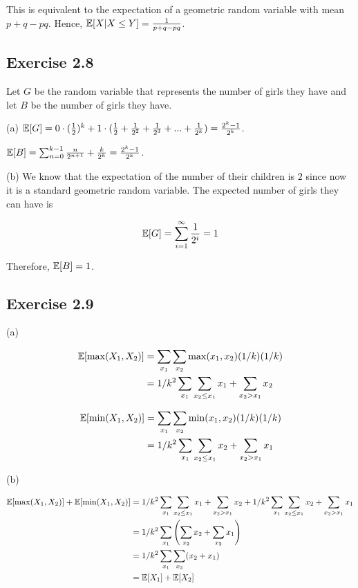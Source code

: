 This is equivalent to the expectation of a geometric random variable with mean $p + q - pq$.
Hence, $\mathbb{E}[X | X \leq Y] = \frac{1}{p+q-pq}$.

\subsection*{Exercise 2.8}

Let $G$ be the random variable that represents the number of girls they have and let $B$ be the number 
of girls they have.

(a) $\mathbb{E}[G] = 0 \cdot (\frac{1}{2})^k + 1 \cdot (\frac{1}{2} + \frac{1}{2^2} + \frac{1}{2^3} + ... + \frac{1}{2^{k}})
= \frac{2^{k}-1}{2 ^k}$.

$\mathbb{E}[B] = \sum_{n = 0}^{k - 1} \frac{n}{2^{n+1}} + \frac{k}{2^k} = \frac{2^k -1}{2^k}$.

(b) We know that the expectation of the number of their children is $2$ since now it is a standard
geometric random variable. The expected number of girls they can have is

\begin{equation*}
	\mathbb{E}[G] = \sum_{i = 1}^{\infty}\frac{1}{2^i} = 1
\end{equation*}

Therefore, $\mathbb{E}[B] = 1$.

\subsection*{Exercise 2.9}

(a) 

\begin{equation*}
\begin{split}
\mathbb{E}[\max(X_1,X_2)] & = \sum_{x_1}\sum_{x_2}\max (x_1, x_2)(1/k)(1/k) \\
& = 1/k^2 \sum_{x_1}\sum_{x_2 \leq x_1} x_1 + \sum_{x_2 > x_1}x_2
\end{split}
\end{equation*}

\begin{equation*}
\begin{split}
\mathbb{E}[\min(X_1,X_2)] & = \sum_{x_1}\sum_{x_2}\min (x_1, x_2)(1/k)(1/k) \\
& = 1/k^2 \sum_{x_1}\sum_{x_2 \leq x_1} x_2 + \sum_{x_2 > x_1}x_1
\end{split}
\end{equation*}

(b)

\begin{equation*}
\begin{split}
\mathbb{E}[\max(X_1,X_2)] + \mathbb{E}[\min(X_1,X_2)] & = 1/k^2 \sum_{x_1}\sum_{x_2 \leq x_1} x_1 + \sum_{x_2 > x_1}x_2 
+ 1/k^2 \sum_{x_1}\sum_{x_2 \leq x_1} x_2 + \sum_{x_2 > x_1}x_1\\
& = 1/k^2 \sum_{x_1} \left( \sum_{x_2}x_2 + \sum_{x_2} x_1 \right) \\
& = 1/k^2 \sum_{x_1}\sum_{x_2}(x_2 + x_1) \\
& = \mathbb{E}[X_1] + \mathbb{E}[X_2]
\end{split}
\end{equation*}

